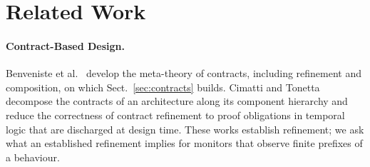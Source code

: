 \section{Related Work}\label{sec:related}

\paragraph{Contract-Based Design.} Benveniste et al.~\cite{Benveniste2018} develop the meta-theory of contracts, including refinement and composition, on which Sect.~\ref{sec:contracts} builds. Cimatti and Tonetta~\cite{CimattiTonetta2015} decompose the contracts of an architecture along its component hierarchy and reduce the correctness of contract refinement to proof obligations in temporal logic that are discharged at design time. These works establish refinement; we ask what an established refinement implies for monitors that observe finite prefixes of a behaviour.

